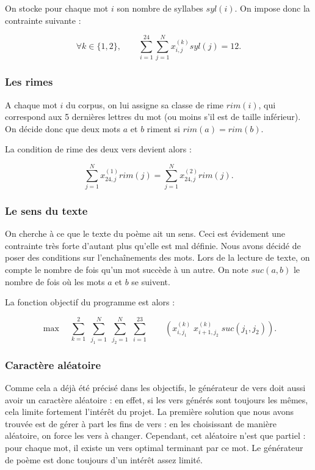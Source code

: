 \documentclass[a4paper,11pt]{article}
\begin{document}
On stocke pour chaque mot $i$ son nombre de syllabes $syl(i)$. On impose donc la contrainte suivante :

\[\forall k \in \{1,2\}, \qquad \sum_{i=1}^{24} \sum_{j=1}^{N} x_{i,j}^{(k)} syl(j) = 12.\]

\subsubsection{Les rimes}

A chaque mot $i$ du corpus, on lui assigne sa classe de rime $rim(i)$, qui correspond aux 5 dernières lettres du mot (ou moins s'il est de taille inférieur). On décide donc que deux mots $a$ et $b$ riment si $rim(a) = rim(b)$.

La condition de rime des deux vers devient alors :

\[ \sum_{j=1}^{N} x_{24,j}^{(1)}  rim(j) = \sum_{j=1}^{N} x_{24,j}^{(2)}  rim(j). \]

\subsubsection{Le sens du texte}

On cherche à ce que le texte du poème ait un sens. Ceci est évidement une contrainte très forte d'autant plus qu'elle est mal définie. Nous avons décidé de poser des conditions sur l'enchaînements des mots. Lors de la lecture de texte, on compte le nombre de fois qu'un mot succède à un autre. On note $suc(a,b)$ le nombre de fois où les mots $a$ et $b$ se suivent.

La fonction objectif du programme est alors :

\[ \max \quad  \sum_{k=1}^{2} \; \sum_{j_1=1}^{N} \; \sum_{j_2=1}^{N} \; \sum_{i=1}^{23}\qquad \left( x_{i,j_1}^{(k)} \; x_{i+1,j_2}^{(k)} \; suc(j_1, j_2)\right) . \]

\subsubsection{Caractère aléatoire}

Comme cela a déjà été précisé dans les objectifs, le générateur de vers doit aussi avoir un caractère aléatoire : en effet, si les vers générés sont toujours les mêmes, cela limite fortement l'intérêt du projet. La première solution que nous avons trouvée est de gérer à part les fins de vers : en les choisissant de manière aléatoire, on force les vers à changer. Cependant, cet aléatoire n'est que partiel : 
pour chaque mot, il existe un vers optimal terminant par ce mot. Le générateur de poème est donc toujours d'un intérêt assez limité. 
\end{document}
